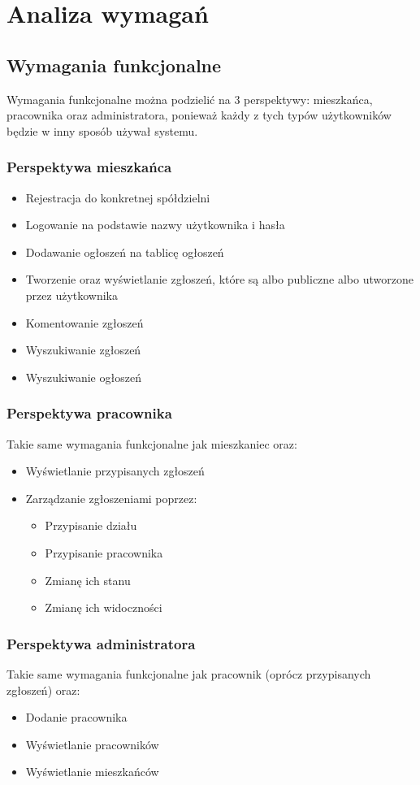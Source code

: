 \newpage
\section{Analiza wymagań}
\subsection{Wymagania funkcjonalne}
Wymagania funkcjonalne można podzielić na 3 perspektywy: mieszkańca, pracownika oraz administratora, ponieważ każdy z tych typów użytkowników będzie w inny sposób używał systemu.
\subsubsection{Perspektywa mieszkańca}
\begin{itemize}
    \item Rejestracja do konkretnej spółdzielni
    \item Logowanie na podstawie nazwy użytkownika i hasła
    \item Dodawanie ogłoszeń na tablicę ogłoszeń
    \item Tworzenie oraz wyświetlanie zgłoszeń, które są albo publiczne albo utworzone przez użytkownika
    \item Komentowanie zgłoszeń
    \item Wyszukiwanie zgłoszeń 
    \item Wyszukiwanie ogłoszeń
\end{itemize}
\subsubsection{Perspektywa pracownika}
Takie same wymagania funkcjonalne jak mieszkaniec oraz:
\begin{itemize}
    \item Wyświetlanie przypisanych zgłoszeń
    \item Zarządzanie zgłoszeniami poprzez:
    \begin{itemize}
        \item Przypisanie działu
        \item Przypisanie pracownika
        \item Zmianę ich stanu
        \item Zmianę ich widoczności
    \end{itemize}
\end{itemize}
\subsubsection{Perspektywa administratora}
Takie same wymagania funkcjonalne jak pracownik (oprócz przypisanych zgłoszeń) oraz:
\begin{itemize}
    \item Dodanie pracownika
    \item Wyświetlanie pracowników
    \item Wyświetlanie mieszkańców
\end{itemize}

